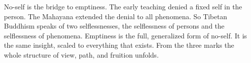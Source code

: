 No-self is the bridge to emptiness. The early teaching denied a fixed self in the person. The Mahayana extended the denial to all phenomena. So Tibetan Buddhism speaks of two selflessnesses, the selflessness of persons and the selflessness of phenomena. Emptiness is the full, generalized form of no-self. It is the same insight, scaled to everything that exists. From the three marks the whole structure of view, path, and fruition unfolds.
